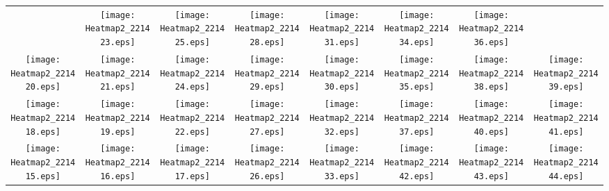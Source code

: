 \documentclass{standalone}
\begin{document}
\renewcommand{\arraystretch}{0}
\setlength{\tabcolsep}{0pt}
\begin{tabular}{ *8{c} }
 & \texttt{[image: Heatmap2\_221423.eps]} & \texttt{[image: Heatmap2\_221425.eps]} & \texttt{[image: Heatmap2\_221428.eps]} & \texttt{[image: Heatmap2\_221431.eps]} & \texttt{[image: Heatmap2\_221434.eps]} & \texttt{[image: Heatmap2\_221436.eps]} &  \\
\texttt{[image: Heatmap2\_221420.eps]} & \texttt{[image: Heatmap2\_221421.eps]} & \texttt{[image: Heatmap2\_221424.eps]} & \texttt{[image: Heatmap2\_221429.eps]} & \texttt{[image: Heatmap2\_221430.eps]} & \texttt{[image: Heatmap2\_221435.eps]} & \texttt{[image: Heatmap2\_221438.eps]} & \texttt{[image: Heatmap2\_221439.eps]} \\
\texttt{[image: Heatmap2\_221418.eps]} & \texttt{[image: Heatmap2\_221419.eps]} & \texttt{[image: Heatmap2\_221422.eps]} & \texttt{[image: Heatmap2\_221427.eps]} & \texttt{[image: Heatmap2\_221432.eps]} & \texttt{[image: Heatmap2\_221437.eps]} & \texttt{[image: Heatmap2\_221440.eps]} & \texttt{[image: Heatmap2\_221441.eps]} \\
\texttt{[image: Heatmap2\_221415.eps]} & \texttt{[image: Heatmap2\_221416.eps]} & \texttt{[image: Heatmap2\_221417.eps]} & \texttt{[image: Heatmap2\_221426.eps]} & \texttt{[image: Heatmap2\_221433.eps]} & \texttt{[image: Heatmap2\_221442.eps]} & \texttt{[image: Heatmap2\_221443.eps]} & \texttt{[image: Heatmap2\_221444.eps]} \\

\end{tabular}
\end{document}
